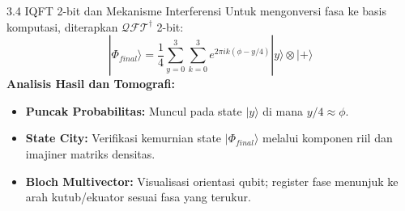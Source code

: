 \begin{frame}{3.4 IQFT 2-bit dan Mekanisme Interferensi}
    Untuk mengonversi fasa ke basis komputasi, diterapkan $\mathcal{QFT}^\dagger$ 2-bit:
    \begin{equation}
        |\Phi_{final}\rangle = \frac{1}{4} \sum_{y=0}^{3} \sum_{k=0}^{3} e^{2\pi i k (\phi - y/4)} |y\rangle \otimes |+\rangle
    \end{equation}
    \textbf{Analisis Hasil dan Tomografi:}
    \begin{itemize}
        \item \textbf{Puncak Probabilitas:} Muncul pada state $|y\rangle$ di mana $y/4 \approx \phi$.
        \item \textbf{State City:} Verifikasi kemurnian state $|\Phi_{final}\rangle$ melalui komponen riil dan imajiner matriks densitas.
        \item \textbf{Bloch Multivector:} Visualisasi orientasi qubit; register fase menunjuk ke arah kutub/ekuator sesuai fasa yang terukur.
    \end{itemize}
\end{frame}

